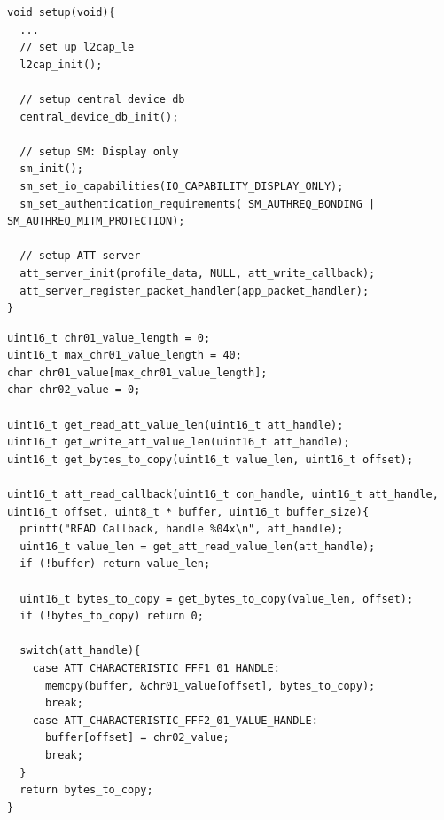 \documentclass[a4paper,titlepage,oneside,12pt]{amsart} %
\begin{document}
\begin{lstlisting}[caption= Setting up LE peripheral., label=code:lePeripheralSetup]
void setup(void){
  ...
  // set up l2cap_le
  l2cap_init();
    
  // setup central device db
  central_device_db_init();

  // setup SM: Display only
  sm_init();
  sm_set_io_capabilities(IO_CAPABILITY_DISPLAY_ONLY);
  sm_set_authentication_requirements( SM_AUTHREQ_BONDING | SM_AUTHREQ_MITM_PROTECTION); 

  // setup ATT server
  att_server_init(profile_data, NULL, att_write_callback);  
  att_server_register_packet_handler(app_packet_handler);
}
\end{lstlisting}


\begin{lstlisting}[caption= Read callback ., label=code:lePeripheralReadCallback]
uint16_t chr01_value_length = 0;
uint16_t max_chr01_value_length = 40;
char chr01_value[max_chr01_value_length];
char chr02_value = 0;

uint16_t get_read_att_value_len(uint16_t att_handle);
uint16_t get_write_att_value_len(uint16_t att_handle);
uint16_t get_bytes_to_copy(uint16_t value_len, uint16_t offset);

uint16_t att_read_callback(uint16_t con_handle, uint16_t att_handle, uint16_t offset, uint8_t * buffer, uint16_t buffer_size){
  printf("READ Callback, handle %04x\n", att_handle);
  uint16_t value_len = get_att_read_value_len(att_handle);
  if (!buffer) return value_len;
      
  uint16_t bytes_to_copy = get_bytes_to_copy(value_len, offset);
  if (!bytes_to_copy) return 0;
  
  switch(att_handle){
    case ATT_CHARACTERISTIC_FFF1_01_HANDLE:
      memcpy(buffer, &chr01_value[offset], bytes_to_copy);
      break;
    case ATT_CHARACTERISTIC_FFF2_01_VALUE_HANDLE:
      buffer[offset] = chr02_value;
      break;
  }
  return bytes_to_copy;
}
\end{lstlisting}
\end{document}
